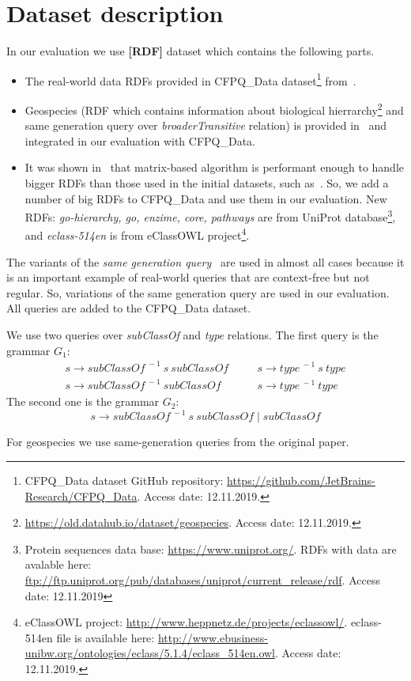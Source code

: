 \section{Dataset description}

In our evaluation we use \textbf{[RDF]} dataset which contains the following parts.
\begin{itemize}
\item The real-world data RDFs provided in CFPQ\_Data dataset\footnote{CFPQ\_Data dataset GitHub repository: \url{https://github.com/JetBrains-Research/CFPQ_Data}. Access date: 12.11.2019.} from~\cite{Mishin:2019:ECP:3327964.3328503}.
\item Geospecies (RDF which contains information about biological hierrarchy\footnote{\url{https://old.datahub.io/dataset/geospecies}. Access date: 12.11.2019.} and same generation query over \textit{broaderTransitive} relation) is provided in~\cite{Kuijpers:2019:ESC:3335783.3335791} and integrated in our evaluation with CFPQ\_Data.
\item It was shown in~\cite{Mishin:2019:ECP:3327964.3328503} that matrix-based algorithm is performant enough to handle bigger RDFs than those used in the initial datasets, such as~\cite{RDF}.
So, we add a number of big RDFs to CFPQ\_Data and use them in our evaluation.
New RDFs: \textit{go-hierarchy, go, enzime, core, pathways} are from UniProt database\footnote{Protein sequences data base: \url{https://www.uniprot.org/}. RDFs with data are avalable here: \url{ftp://ftp.uniprot.org/pub/databases/uniprot/current_release/rdf}. Access date: 12.11.2019}, and \textit{eclass-514en} is from eClassOWL project\footnote{eClassOWL project: \url{http://www.heppnetz.de/projects/eclassowl/}. eclass-514en file is available here: \url{http://www.ebusiness-unibw.org/ontologies/eclass/5.1.4/eclass_514en.owl}. Access date: 12.11.2019.}.
\end{itemize}

The variants of the \textit{same generation query}~\cite{FndDB} are used in almost all cases because it is an important example of real-world queries that are context-free but not regular.
So, variations of the same generation query are used in our evaluation.
All queries are added to the CFPQ\_Data dataset.

We use two queries over \textit{subClassOf} and \textit{type} relations.
The first query is the grammar $G_1$:
\[
 \begin{array}{lcl}
   s  \rightarrow \textit{subClassOf}^{\ -1} \ s \ \textit{subClassOf}   & \quad & s  \rightarrow \textit{type}^{\ -1} \ s \ \textit{type}     \\
   s  \rightarrow \textit{subClassOf}^{\ -1} \ \textit{subClassOf}       & \quad & s  \rightarrow  \textit{type}^{\ -1}  \ \textit{type}

 \end{array}
 \]
The second one is the grammar $G_2$: \[s \rightarrow \textit{subClassOf}^{\ -1} \ s \ \textit{subClassOf} \mid  \textit{subClassOf}\]

For geospecies we use same-generation queries from the original paper.
